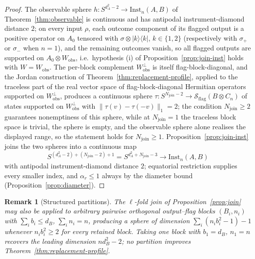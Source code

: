 \documentclass[11pt,a4paper]{article}
\newtheorem{remark}[theorem]{Remark}
\newcommand{\Sstate}{\mathcal{S}}
\newcommand{\Inst}{\mathrm{Inst}}
\begin{document}
\begin{proof}
The observable sphere $h:S^{d_A^2-2}\to\Inst_n(A,B)$ of Theorem~\ref{thm:observable} is continuous and has antipodal instrument-diamond distance $2$; on every input $\rho$, each outcome component of its flagged output is a positive operator on $A_0$ tensored with $\sigma\otimes|k\rangle\langle k|$, $k\in\{1,2\}$ (respectively with $\sigma_+$ or $\sigma_-$ when $n=1$), and the remaining outcomes vanish, so all flagged outputs are supported on $A_0\otimes W_{\mathrm{obs}}$, i.e.\ hypothesis (i) of Proposition~\ref{prop:join-inst} holds with $W=W_{\mathrm{obs}}$. The per-block complement $W_{\mathrm{obs}}^{\perp}$ is itself flag-block-diagonal, and the Jordan construction of Theorem~\ref{thm:replacement-profile}, applied to the traceless part of the real vector space of flag-block-diagonal Hermitian operators supported on $W_{\mathrm{obs}}^{\perp}$, produces a continuous sphere $\tau:S^{N_{\mathrm{join}}-2}\to\Sstate_{\mathrm{flag}}(B\otimes C_n)$ of states supported on $W_{\mathrm{obs}}^{\perp}$ with $\|\tau(v)-\tau(-v)\|_1=2$; the condition $N_{\mathrm{join}}\ge2$ guarantees nonemptiness of this sphere, while at $N_{\mathrm{join}}=1$ the traceless block space is trivial, the sphere is empty, and the observable sphere alone realises the displayed range, so the statement holds for $N_{\mathrm{join}}\ge1$. Proposition~\ref{prop:join-inst} joins the two spheres into a continuous map
\[
S^{(d_A^2-2)+(N_{\mathrm{join}}-2)+1}=S^{d_A^2+N_{\mathrm{join}}-3}\longrightarrow\Inst_n(A,B)
\]
with antipodal instrument-diamond distance $2$; equatorial restriction supplies every smaller index, and $\alpha_r\le1$ always by the diameter bound (Proposition~\ref{prop:diameter}).
\end{proof}

\begin{remark}[Structured partitions]
\label{rem:partitions}
The $\ell$-fold join of Proposition~\ref{prop:join} may also be applied to arbitrary pairwise orthogonal output--flag blocks $(B_i,n_i)$ with $\sum_ib_i\le d_B$, $\sum_in_i=n$, producing a sphere of dimension $\sum_i(n_ib_i^2-1)-1$ whenever $n_ib_i^2\ge2$ for every retained block. Taking one block with $b_1=d_B$, $n_1=n$ recovers the leading dimension $nd_B^2-2$; no partition improves Theorem~\ref{thm:replacement-profile}.
\end{remark}
\end{document}
